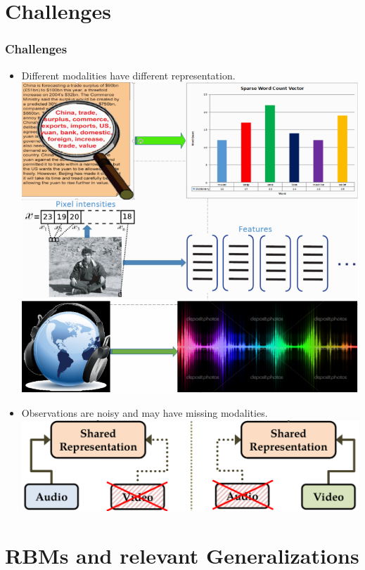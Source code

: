 \documentclass{beamer}
\begin{document}
\begin{CJK*}{UTF8}{gbsn}
\section{Challenges}
\begin{frame}[allowframebreaks]\frametitle{Challenges}
\begin{itemize}
\item Different modalities have different representation.
\centering
\includegraphics[scale=0.21]{images/multimodaldata}
\item Observations are noisy and may have missing modalities.
\includegraphics[scale=0.29]{images/missingmodality}
\end{itemize}
\end{frame}


\section{RBMs and relevant Generalizations}

\end{CJK*}
\end{document}
